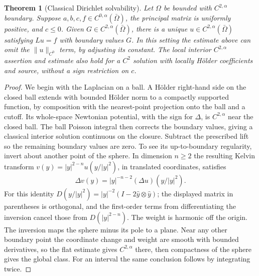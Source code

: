 \documentclass[11pt,oneside,openany]{book}
\theoremstyle{plain}
\newtheorem{theorem}{Theorem}[chapter]
\theoremstyle{definition}
\theoremstyle{remark}
\begin{document}
\begin{theorem}[Classical Dirichlet solvability]
\label{pde:elliptic-schauder-solvability}
Let \(\Omega\) be bounded with \(C^{2,\alpha}\) boundary.
Suppose \(a,b,c,f\in C^{0,\alpha}(\bar\Omega)\), the
principal matrix is uniformly positive, and \(c\leq0\).
Given \(G\in C^{2,\alpha}(\bar\Omega)\), there is a unique
\(u\in C^{2,\alpha}(\bar\Omega)\) satisfying \(Lu=f\) with
boundary values \(G\). In this setting the estimate above
can omit the \(\|u\|_{C^0}\) term, by adjusting its constant.
The local interior \(C^{2,\alpha}\) assertion and estimate
also hold for a \(C^2\) solution with locally Hölder
coefficients and source, without a sign restriction on \(c\).
\end{theorem}

\begin{proof}
We begin with the Laplacian on a ball. A Hölder right-hand
side on the closed ball extends with bounded Hölder norm
to a compactly supported function, by composition with
the nearest-point projection onto the ball and a cutoff.
Its whole-space Newtonian potential, with the sign
for \(\Delta\), is \(C^{2,\alpha}\) near the closed ball.
The ball Poisson integral then corrects the boundary
values, giving a classical interior solution continuous
on the closure. Subtract the prescribed lift so the
remaining boundary values are zero. To see its up-to-boundary
regularity, invert about another point of the sphere.
In dimension \(n\geq2\) the resulting Kelvin transform
\(v(y)=|y|^{2-n}u(y/|y|^2)\), in translated coordinates,
satisfies
\[
 \Delta v(y)=|y|^{-n-2}(\Delta u)(y/|y|^2).
\]
For this identity \(D(y/|y|^2)=|y|^{-2}
(I-2\hat y\otimes\hat y)\); the displayed matrix in
parentheses is orthogonal, and the first-order terms from
differentiating the inversion cancel those from
\(D(|y|^{2-n})\). The weight is harmonic off the origin.
The inversion maps the sphere minus its pole to a plane.
Near any other boundary point the coordinate change and
weight are smooth with bounded derivatives, so the flat
estimate gives \(C^{2,\alpha}\) there, then compactness
of the sphere gives the global class. For an interval the
same conclusion follows by integrating twice.


\end{proof}
\end{document}
